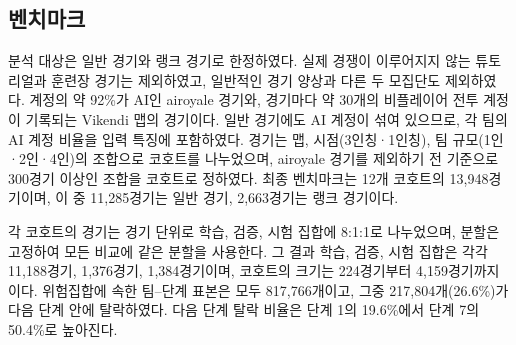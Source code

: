 \subsection{벤치마크}
\label{sec:data:benchmark}

분석 대상은 일반 경기와 랭크 경기로 한정하였다.
실제 경쟁이 이루어지지 않는 튜토리얼과 훈련장 경기는 제외하였고, 일반적인 경기 양상과 다른 두 모집단도 제외하였다.
계정의 약 92\%가 AI인 airoyale 경기와, 경기마다 약 30개의 비플레이어 전투 계정이 기록되는 Vikendi 맵의 경기이다.
일반 경기에도 AI 계정이 섞여 있으므로, 각 팀의 AI 계정 비율을 입력 특징에 포함하였다.
경기는 맵, 시점(3인칭·1인칭), 팀 규모(1인·2인·4인)의 조합으로 코호트를 나누었으며, airoyale 경기를 제외하기 전 기준으로 300경기 이상인 조합을 코호트로 정하였다.
최종 벤치마크는 12개 코호트의 13,948경기이며, 이 중 11,285경기는 일반 경기, 2,663경기는 랭크 경기이다.

각 코호트의 경기는 경기 단위로 학습, 검증, 시험 집합에 8:1:1로 나누었으며, 분할은 고정하여 모든 비교에 같은 분할을 사용한다.
그 결과 학습, 검증, 시험 집합은 각각 11,188경기, 1,376경기, 1,384경기이며, 코호트의 크기는 224경기부터 4,159경기까지이다.
위험집합에 속한 팀--단계 표본은 모두 817,766개이고, 그중 217,804개(26.6\%)가 다음 단계 안에 탈락하였다.
다음 단계 탈락 비율은 단계 1의 19.6\%에서 단계 7의 50.4\%로 높아진다.
